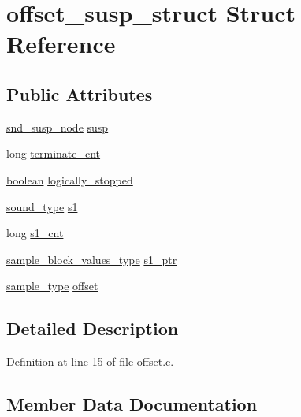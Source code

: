\hypertarget{structoffset__susp__struct}{}\section{offset\+\_\+susp\+\_\+struct Struct Reference}
\label{structoffset__susp__struct}
\subsection*{Public Attributes}
\begin{DoxyCompactItemize}
\item 
\hyperlink{sound_8h_a6b268203688a934bd798ceb55f85d4c0}{snd\+\_\+susp\+\_\+node} \hyperlink{structoffset__susp__struct_a466f7f6ffc41d04abefb5c11985adb6c}{susp}
\item 
long \hyperlink{structoffset__susp__struct_a622c7be67f53965b42ec6da4cd5f704f}{terminate\+\_\+cnt}
\item 
\hyperlink{cext_8h_a7670a4e8a07d9ebb00411948b0bbf86d}{boolean} \hyperlink{structoffset__susp__struct_a42dbf617bae6081917f4a8f2d10d899c}{logically\+\_\+stopped}
\item 
\hyperlink{sound_8h_a792cec4ed9d6d636d342d9365ba265ea}{sound\+\_\+type} \hyperlink{structoffset__susp__struct_a32f97b0f40afd4edb1afbee57b662521}{s1}
\item 
long \hyperlink{structoffset__susp__struct_a173acd8c68e76f13a3e0252c620ce9d0}{s1\+\_\+cnt}
\item 
\hyperlink{sound_8h_a83d17f7b465d1591f27cd28fc5eb8a03}{sample\+\_\+block\+\_\+values\+\_\+type} \hyperlink{structoffset__susp__struct_a86b3a0c080484ac279c8634895bea579}{s1\+\_\+ptr}
\item 
\hyperlink{sound_8h_a3a9d1d4a1c153390d2401a6e9f71b32c}{sample\+\_\+type} \hyperlink{structoffset__susp__struct_a1aa87eef9adf865ebc43c1af631ff2c8}{offset}
\end{DoxyCompactItemize}


\subsection{Detailed Description}


Definition at line 15 of file offset.\+c.



\subsection{Member Data Documentation}

